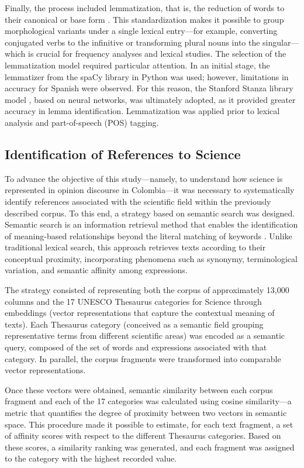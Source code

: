 \documentclass[pdflatex,sn-mathphys-num, iicol]{sn-jnl}
\begin{document}
	Finally, the process included lemmatization, that is, the reduction of words to their canonical or base form \cite{Orellana2018}. This standardization makes it possible to group morphological variants under a single lexical entry—for example, converting conjugated verbs to the infinitive or transforming plural nouns into the singular—which is crucial for frequency analyses and lexical studies. The selection of the lemmatization model required particular attention. In an initial stage, the lemmatizer from the spaCy library in Python was used; however, limitations in accuracy for Spanish were observed. For this reason, the Stanford Stanza library model \cite{qi2020stanza}, based on neural networks, was ultimately adopted, as it provided greater accuracy in lemma identification. Lemmatization was applied prior to lexical analysis and part-of-speech (POS) tagging.\\

	
	\subsection{Identification of References to Science}\label{subsec:identification}
	
	To advance the objective of this study---namely, to understand how science is represented in opinion discourse in Colombia---it was necessary to systematically identify references associated with the scientific field within the previously described corpus. To this end, a strategy based on semantic search was designed. Semantic search is an information retrieval method that enables the identification of meaning-based relationships beyond the literal matching of keywords \cite{Wei2022}. Unlike traditional lexical search, this approach retrieves texts according to their conceptual proximity, incorporating phenomena such as synonymy, terminological variation, and semantic affinity among expressions.
	
	The strategy consisted of representing both the corpus of approximately 13,000 columns and the 17 UNESCO Thesaurus categories for Science through embeddings (vector representations that capture the contextual meaning of texts). Each Thesaurus category (conceived as a semantic field grouping representative terms from different scientific areas) was encoded as a semantic query, composed of the set of words and expressions associated with that category. In parallel, the corpus fragments were transformed into comparable vector representations.
	
	
	Once these vectors were obtained, semantic similarity between each corpus fragment and each of the 17 categories was calculated using cosine similarity---a metric that quantifies the degree of proximity between two vectors in semantic space. This procedure made it possible to estimate, for each text fragment, a set of affinity scores with respect to the different Thesaurus categories. Based on these scores, a similarity ranking was generated, and each fragment was assigned to the category with the highest recorded value.
	
\end{document}
